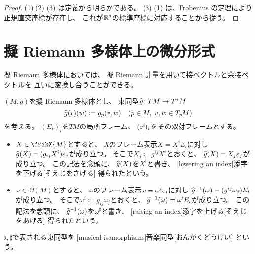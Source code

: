 \documentclass[report]{jlreq}
\begin{document}
\begin{proof}
    (1) \Rightarrow (2) \Rightarrow (3) は定義から明らかである。
    (3) \Rightarrow (1) は、Frobenius の定理により正規直交座標が存在し、
    これが$\mathbb{R}^n$の標準座標に対応することから従う。
\end{proof}

%
\section{擬 Riemann 多様体上の微分形式}

擬 Riemann 多様体においては、
擬 Riemann 計量を用いて接ベクトルと余接ベクトルを
互いに変換し合うことができる。

\begin{definition}[音楽同型]
    $(M, g)$を擬 Riemann 多様体とし、
    束同型$\widehat{g} \colon TM \to T^*M$
    \begin{equation}
        \widehat{g}(v)(w) \coloneqq g_p(v, w)
            \quad
            (p \in M, \; v, w \in T_p M)
    \end{equation}
    を考える。
    $(E_i)_i$を$TM$の局所フレーム、
    $(\varepsilon^i)_i$をその双対フレームとする。
    \begin{itemize}
        \item $X \in \frakX{M}$とすると、
            $X$のフレーム表示$X = X^i E_i$に対し
            $\widehat{g}(X) = (g_{ij} X^i) \varepsilon_j$が成り立つ。
            そこで$X_j \coloneqq g^{ij} X^i$とおくと、
            $\widehat{g}(X) = X_j \varepsilon_j$が成り立つ。
            この記法を念頭に、
            $\widehat{g}(X)$を$X^\flat$と書き、
            [lowering an index]{添字を下げる}[そえじをさげる]
            得られたという。
        \item $\omega \in \Omega(M)$とすると、
            $\omega$のフレーム表示$\omega = \omega^i \varepsilon_i$に対し
            $\widehat{g}^{-1}(\omega) = (g^{ij} \omega_j) E_i$が成り立つ。
            そこで$\omega^i \coloneqq g_{ij} \omega_j$とおくと、
            $\widehat{g}^{-1}(\omega) = \omega^i E_i$が成り立つ。
            この記法を念頭に、
            $\widehat{g}^{-1}(\omega)$を$\omega^\sharp$と書き、
            [raising an index]{添字を上げる}[そえじをあげる]
            得られたという。
    \end{itemize}
    $\flat, \sharp$で表される束同型を
    [musical isomorphisms]{音楽同型}[おんがくどうけい]
    という。
\end{definition}
\end{document}
